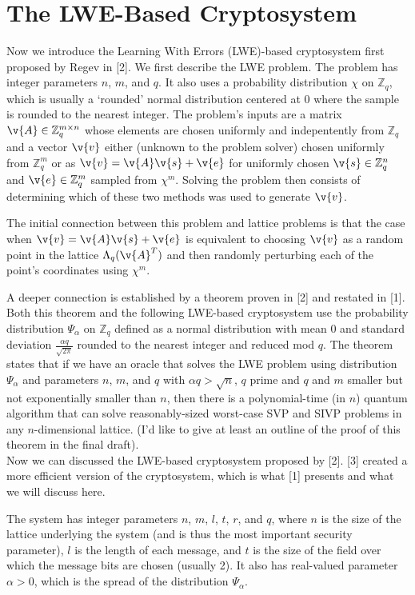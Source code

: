 \section{The LWE-Based Cryptosystem}\label{sec:lwe}
Now we introduce the Learning With Errors (LWE)-based cryptosystem
first proposed by Regev in [2]. We first describe the LWE problem.
The problem has integer parameters $n$, $m$, and $q$. It also
uses a probability distribution $\chi$ on $\mathbb{Z}_q$, which is
usually a `rounded' normal distribution centered at 0 where the
sample is rounded to the nearest integer.
The problem's inputs are a matrix $\v{A} \in \mathbb{Z}_q^{m \times n}$
whose elements are chosen uniformly and indepentently from $\mathbb{Z}_q$
and a vector $\v{v}$ either (unknown to the problem solver) chosen
uniformly from $\mathbb{Z}_q^m$ or as $\v{v} = \v{A}\v{s} + \v{e}$
for uniformly chosen $\v{s} \in \mathbb{Z}_q^n$ and $\v{e} \in \mathbb{Z}_q^m$ sampled from $\chi^m$. Solving the problem then consists of determining
which of these two methods was used to generate $\v{v}$.

The initial connection between this problem and lattice problems is that
the case when $\v{v} = \v{A}\v{s} + \v{e}$ is equivalent to choosing
$\v{v}$ as a random point in the lattice $\Lambda_q(\v{A}^T)$ and then
randomly perturbing each of the point's coordinates using $\chi^m$.

A deeper connection is established by a theorem proven in [2] and 
restated in [1]. Both this theorem and the following LWE-based
cryptosystem use the probability distribution $\Psi_{\alpha}$ on $\mathbb{Z}_q$
defined as a normal distribution with mean 0 and standard deviation
$\frac{\alpha q}{\sqrt{2\pi}}$ rounded to the nearest integer and
reduced mod $q$.
The theorem states that if we have an oracle that 
solves the LWE problem using distribution $\Psi_{\alpha}$ and parameters
$n$, $m$, and $q$ with $\alpha q > \sqrt{n}$, $q$ prime and $q$ and $m$
smaller but not exponentially smaller than $n$, then there is a polynomial-time (in $n$) quantum algorithm that can solve reasonably-sized worst-case
SVP and SIVP problems in any $n$-dimensional lattice. (I'd like to give
at least an outline of the proof of this theorem in the final draft).\\

Now we can discussed the LWE-based cryptosystem proposed by [2]. [3] created a
more efficient version of the cryptosystem, which is what [1] presents
and what we will discuss here.

The system has integer parameters $n$, $m$, $l$, $t$, $r$, and $q$, where $n$ is the size of the lattice underlying the system (and is thus
the most important security parameter), $l$ is the length of each message, and
$t$ is the size of the field over which the message bits are chosen (usually 2).
It also has real-valued parameter $\alpha > 0$, which is the spread of
the distribution $\Psi_{\alpha}$.

